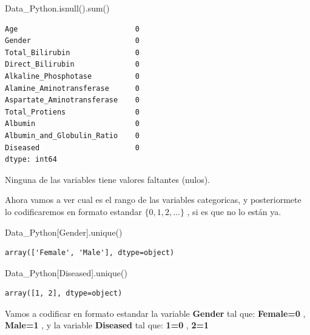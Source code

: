\documentclass[
  11pt,
  a4paper,
]{article}
\newenvironment{Shaded}{\begin{snugshade}}{\end{snugshade}}
\newcommand{\BuiltInTok}[1]{#1}
\newcommand{\NormalTok}[1]{#1}
\newcommand{\StringTok}[1]{\textcolor[rgb]{0.31,0.60,0.02}{#1}}
\begin{document}
\begin{Shaded}
\begin{Highlighting}[]
\NormalTok{Data\_Python.isnull().}\BuiltInTok{sum}\NormalTok{()}
\end{Highlighting}
\end{Shaded}

\begin{verbatim}
Age                           0
Gender                        0
Total_Bilirubin               0
Direct_Bilirubin              0
Alkaline_Phosphotase          0
Alamine_Aminotransferase      0
Aspartate_Aminotransferase    0
Total_Protiens                0
Albumin                       0
Albumin_and_Globulin_Ratio    0
Diseased                      0
dtype: int64
\end{verbatim}

Ninguna de las variables tiene valores faltantes (nulos).

\vspace{0.7cm}

Ahora vamos a ver cual es el rango de las variables categoricas, y
posteriormete lo codificaremos en formato estandar
\(\lbrace 0,1,2,...\rbrace\) , si es que no lo están ya.

\begin{Shaded}
\begin{Highlighting}[]
\NormalTok{Data\_Python[}\StringTok{\textquotesingle{}Gender\textquotesingle{}}\NormalTok{].unique()}
\end{Highlighting}
\end{Shaded}

\begin{verbatim}
array(['Female', 'Male'], dtype=object)
\end{verbatim}

\begin{Shaded}
\begin{Highlighting}[]
\NormalTok{Data\_Python[}\StringTok{\textquotesingle{}Diseased\textquotesingle{}}\NormalTok{].unique()}
\end{Highlighting}
\end{Shaded}

\begin{verbatim}
array([1, 2], dtype=object)
\end{verbatim}

Vamos a codificar en formato estandar la variable \textbf{Gender} tal
que: \textbf{Female=0} , \textbf{Male=1} , y la variable
\textbf{Diseased} tal que: \textbf{1=0} , \textbf{2=1}
\end{document}
